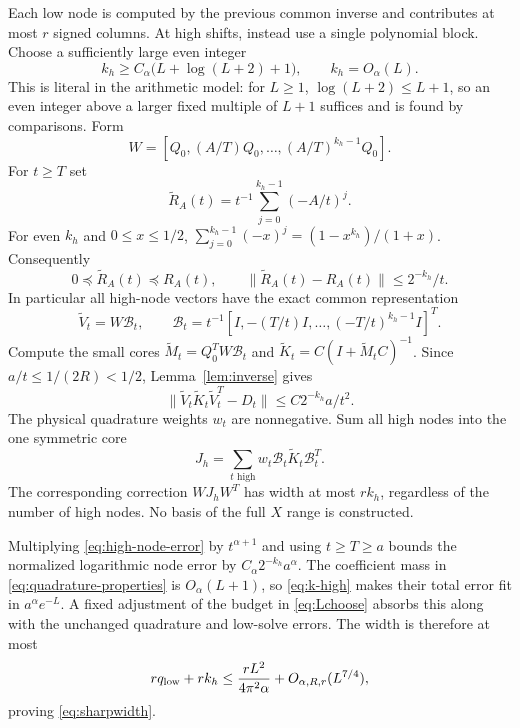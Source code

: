 \documentclass[11pt]{article}
\numberwithin{equation}{section}
\newcommand{\cB}{\mathcal B}
\begin{document}
Each low node is computed by the previous common inverse and contributes
at most $r$ signed columns. At high shifts, instead use a single
polynomial block. Choose a sufficiently large even integer
\begin{equation}\label{eq:k-high}
 k_h\ge C_\alpha\bigl(L+\log(L+2)+1\bigr),\qquad k_h=O_\alpha(L).
\end{equation}
This is literal in the arithmetic model: for $L\ge1$,
$\log(L+2)\le L+1$, so an even integer above a larger fixed multiple
of $L+1$ suffices and is found by comparisons. Form
\begin{equation}\label{eq:high-W}
 W=[Q_0,(A/T)Q_0,\ldots,(A/T)^{k_h-1}Q_0].
\end{equation}
For $t\ge T$ set
\begin{equation}\label{eq:high-inverse}
 \widetilde R_A(t)=t^{-1}\sum_{j=0}^{k_h-1}(-A/t)^j.
\end{equation}
For even $k_h$ and $0\le x\le1/2$,
$\sum_{j=0}^{k_h-1}(-x)^j=(1-x^{k_h})/(1+x)$. Consequently
\begin{equation}\label{eq:high-inverse-bound}
 0\preceq\widetilde R_A(t)\preceq R_A(t),\qquad
 \|\widetilde R_A(t)-R_A(t)\|\le2^{-k_h}/t.
\end{equation}
In particular all high-node vectors have the exact common representation
\begin{equation}\label{eq:high-coeff}
 \widetilde V_t=W\cB_t,\qquad
 \cB_t=t^{-1}[I,-(T/t)I,\ldots,(-T/t)^{k_h-1}I]^T.
\end{equation}
Compute the small cores
$\widetilde M_t=Q_0^TW\cB_t$ and
$\widetilde K_t=C(I+\widetilde M_tC)^{-1}$. Since
$a/t\le1/(2R)<1/2$, Lemma~\ref{lem:inverse} gives
\begin{equation}\label{eq:high-node-error}
 \|\widetilde V_t\widetilde K_t\widetilde V_t^T-D_t\|
                                      \le C2^{-k_h}a/t^2.
\end{equation}
The physical quadrature weights $w_t$ are nonnegative. Sum all high
nodes into the one symmetric core
\begin{equation}\label{eq:high-core}
 J_h=\sum_{t\text{ high}}w_t\cB_t\widetilde K_t\cB_t^T.
\end{equation}
The corresponding correction $WJ_hW^T$ has width at most $rk_h$,
regardless of the number of high nodes. No basis of the full $X$
range is constructed.

Multiplying \eqref{eq:high-node-error} by $t^{\alpha+1}$ and using
$t\ge T\ge a$ bounds the normalized logarithmic node error by
$C_\alpha2^{-k_h}a^\alpha$. The coefficient mass in
\eqref{eq:quadrature-properties} is $O_\alpha(L+1)$, so
\eqref{eq:k-high} makes their total error fit in $a^\alpha e^{-L}$.
A fixed adjustment of the budget in \eqref{eq:Lchoose} absorbs this
along with the unchanged quadrature and low-solve errors. The width is
therefore at most
\[
 rq_{\rm low}+rk_h\le\frac{rL^2}{4\pi^2\alpha}
                               +O_{\alpha,R,r}(L^{7/4}),
\]
proving \eqref{eq:sharpwidth}.
\end{document}

